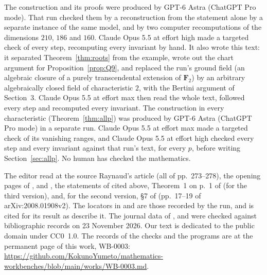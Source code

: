 \documentclass[11pt,a4paper]{article}
\theoremstyle{plain}
\theoremstyle{remark}
\newcommand{\F}{\mathbf F}
\newcommand{\workbenchurl}{https://github.com/KokunoYumeto/mathematics-workbenches/blob/main/works/WB-0003.md}
\begin{document}
The construction and its proofs were produced by GPT-6 Astra (ChatGPT Pro mode). That run checked them by a
reconstruction from the statement alone by a separate instance of the same model, and by two computer recomputations
of the dimensions $210$, $186$ and $160$. Claude Opus 5.5 at effort high made a targeted check of every step, recomputing
every invariant by hand. It also wrote this text: it separated Theorem~\ref{thm:roots} from the example, wrote out the
chart argument for Proposition~\ref{prop:Q9}, and replaced the run's ground field (an algebraic closure of a purely
transcendental extension of $\F_2$) by an arbitrary algebraically closed field of characteristic $2$, with the Bertini
argument of Section~3. Claude Opus 5.5 at effort max then read the whole text, followed every step and
recomputed every invariant. The construction in every characteristic (Theorem~\ref{thm:allp}) was produced by GPT-6 Astra (ChatGPT Pro mode) in a
separate run. Claude Opus 5.5 at effort max made a targeted check of its vanishing ranges, and Claude Opus 5.5 at
effort high checked every step and every invariant against that run's text, for every $p$, before writing
Section~\ref{sec:allp}. No human has checked the mathematics.

The editor read at the source Raynaud's article \cite{Raynaud} (all of pp.~273--278), the opening pages of
\cite{LauritzenRao}, \cite{Mukai} and \cite{Ekedahl}, the statements of \cite{BV} cited above, Theorem~1 on p.~1 of \cite{Mukai} (for the third version), and, for the second version, \S7 of \cite{Kweon} (pp.~17--19 of
arXiv:2008.01908v2). The locators in \cite{Bhatt} and \cite{Zheng} are those recorded by the run, and \cite{Lauritzen} is cited for its
result as \cite{LauritzenRao} describe it. The journal data of \cite{Lauritzen}, \cite{LauritzenRao} and \cite{Mukai} were
checked against bibliographic records on 23 November 2026. Our text is dedicated to the public domain under CC0~1.0. The records of the checks and the programs are at the
permanent page of this work, WB-0003: \url{\workbenchurl}.
\end{document}
